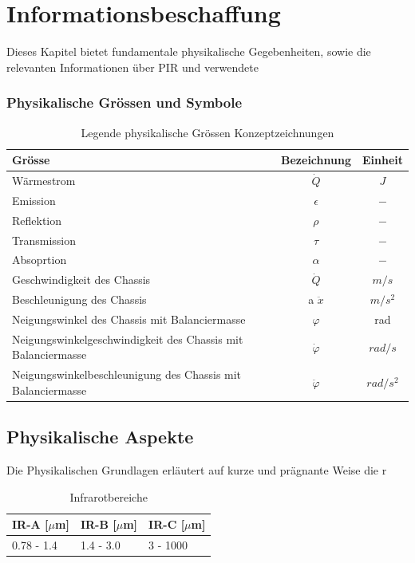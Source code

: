 \chapter{Informationsbeschaffung}
\label{chap:Informationsbeschaffung}
Dieses Kapitel bietet fundamentale physikalische Gegebenheiten, sowie die relevanten Informationen über \ac{PIR} und verwendete 


\subsection*{Physikalische Grössen und Symbole}
\begin{table}[H]
	\begin{tabular}{l|c|c}
		
		\rowcolor{gray} Grösse &  Bezeichnung  & Einheit \\
		\hline 
		Wärmestrom &  $\dot{Q}$ & $J$  \\ 
		\rowcolor{gray}Emission & $\epsilon$ & $-$\\	
		Reflektion &  $\rho $ & $-$ \\
		\rowcolor{gray} Transmission & $\tau$ & $-$\\
		Absoprtion &  $\alpha$ & $-$  \\ 
		
		\rowcolor{gray}Geschwindigkeit des Chassis & $\dot{Q}$ & $m/s$\\
		Beschleunigung des Chassis &  a $\ddot{x}$ & $m/s^2$ \\
		\rowcolor{gray}Neigungswinkel des Chassis mit Balanciermasse &  $\varphi$ & rad \\ 
		Neigungswinkelgeschwindigkeit des Chassis mit Balanciermasse & $\dot\varphi $ & $ rad/s$ \\ 
		\rowcolor{gray} Neigungswinkelbeschleunigung des Chassis mit Balanciermasse & $\ddot\varphi $ & $ rad/s^2 $ \\ 
	\end{tabular}
	\caption{Legende physikalische Grössen Konzeptzeichnungen}
	\label{tab:Legende Physikalische Grössen} 
\end{table} 



\section{Physikalische Aspekte}

Die Physikalischen Grundlagen erläutert auf kurze und prägnante Weise die r

\begin{table}[]
	\centering
	\caption{Infrarotbereiche}
	\label{my-label}
	\begin{tabular}{|l|l|l|}
		\hline
		IR-A {[}$\mu$m{]} & IR-B {[}$\mu$m{]} & IR-C {[}$\mu$m{]} \\ \hline
		0.78 - 1.4  & 1.4 - 3.0   & 3 - 1000    \\ \hline
	\end{tabular}
\end{table}

